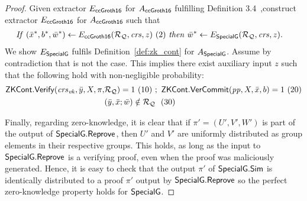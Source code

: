 \begin{proof}
\noindent Given extractor $E_{{\mathsf{ccGroth16}}}$ for $A_{{\mathsf{ccGroth16}}}$ fulfilling Definition 3.4~\cite{LegoSNARK},construct extractor $E_{{\mathsf{ccGroth16}}}$ for $A_{{\mathsf{ccGroth16}}}$ such that 
\begin{align*}
&\mathit{If} \ (\bar{x}^*, b^*, \bar{w}^*) \leftarrow E_{{\mathsf{ccGroth16}}} (\mathcal{R}_{\mathcal{Q}}, \mathit{crs}, z)\ (2)\ \mathit{then} \ \bar{w}^* \leftarrow E_{{\mathsf{SpecialG}}} (\mathcal{R}_{\mathcal{Q}}, \mathit{crs}, z).
\end{align*}
We show $E_{{\mathsf{SpecialG}}}$ fulfils Definition~\ref{def:zk_cont} for $A_{{\mathsf{SpecialG}}}$. Assume by contradiction that is not the case. 
This implies there exist auxiliary input $z$ such that the following hold with non-negligible probability: 
\begin{align*}
\ZKCont.\Verify(\crsvk, \bary, X, \pi, &\relRQ) =1 \ (10)\ ; \ \ZKCont.\VerifyCom(\pp, X, \barx, b) =1 \ (20) \\
& (\bary, \barx; \baromega) \notin \relRQ  \ \ (30) 
\end{align*}

\noindent Finally, regarding zero-knowledge, it is clear that if $\pi' = (U', V', W')$ is part of the output of ${\mathsf{SpecialG}}.{\mathsf{Reprove}}$, 
then $U'$ and $V'$ are uniformly distributed as group elements in their respective groups. This holds, as long as the 
input to ${\mathsf{SpecialG}}.{\mathsf{Reprove}}$ is a verifying proof, even when the proof was maliciously generated. Hence, it is easy to check  
that the output $\pi'$ of ${\mathsf{SpecialG}}.{\mathsf{Sim}}$ is identically distributed to a proof $\pi'$ output by ${\mathsf{SpecialG}}.{\mathsf{Reprove}}$ so the perfect 
zero-knowledge property holds for ${\mathsf{SpecialG}}$. 
\end{proof}

